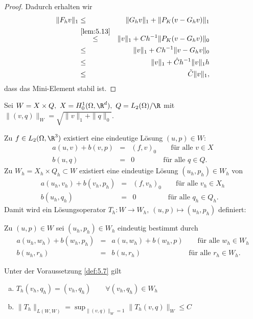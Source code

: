 \begin{proof}
    Dadurch erhalten wir
    \begin{eqnarray*}
              \|F_h v\|_1
        &\le& \|G_h v\|_1 + \|P_K(v - G_h v)\|_1 \\
        &\stackrel{\eqref{lem:5.13}}{\le}&
              \|v\|_1 + C h^{-1} \|P_K(v - G_h v)\|_0 \\
        &\le& \|v\|_1 + C h^{-1} \|v - G_h v\|_0 \\
        &\le& \|v\|_1 + \hat C h^{-1} \|v\|_1 h \\
        &\le& \tilde C \|v\|_1,
    \end{eqnarray*}
    dass das Mini-Element stabil ist.
\end{proof}


Sei $W = X \times Q, \ X = H_0^1(\Omega, \R^d), \ Q = L_2(\Omega) / \R$ mit
$\|(v, q)\|_W = \sqrt{\|v\|_1 + \|q\|_0}$.

Zu $f\in L_2(\Omega, \R^3)$ existiert eine eindeutige Lösung $(u, p)\in W$:
\begin{eqnarray*}
    a(u, v) + b(v, p) &=& (f, v)_0
    \qquad \text{für alle } v\in X \\
    b(u, q) &=& 0
    \qquad \qquad \text{für alle } q\in Q.
\end{eqnarray*}
Zu $W_h = X_h \times Q_h \subset W$ existiert eine eindeutige Lösung
$(u_h, p_h)\in W_h$ von
\begin{eqnarray*}
    a(u_h, v_h) + b(v_h, p_h) &=& (f, v_h)_0
    \qquad \text{für alle } v_h\in X_h \\
    b(u_h, q_h) &=& 0
    \qquad \ \qquad \ \text{für alle } q_h\in Q_h.
\end{eqnarray*}
Damit wird ein Lösungsoperator $T_h: W \to W_h, \ (u, p) \mapsto (u_h, p_h)$
definiert:

Zu $(u, p)\in W$ sei $(u_h, p_h)\in W_h$ eindeutig bestimmt durch
\begin{eqnarray*}
    a(u_h, w_h) + b(w_h, p_h) &=& a(u, w_h) + b(w_h, p)
    \qquad \text{für alle } w_h\in W_h \\
    b(u_h, r_h) &=& b(u, r_h)
    \qquad \ \qquad \ \qquad \ \text{für alle } r_h\in W_h.
\end{eqnarray*}


\begin{Lemma}
    \label{lem:5.15}
    Unter der Voraussetzung \eqref{def:5.7} gilt
    \begin{enumerate}[a)]
      \item
        $T_h(v_h, q_h) = (v_h, q_h)
        \qquad \forall (v_h, q_h)\in W_h$
      \item
        $\|T_h\|_{L(W, W)} = \sup_{\|(v, q)\|_W = 1} \|T_h(v, q)\|_W \le C$
    \end{enumerate}
\end{Lemma}


